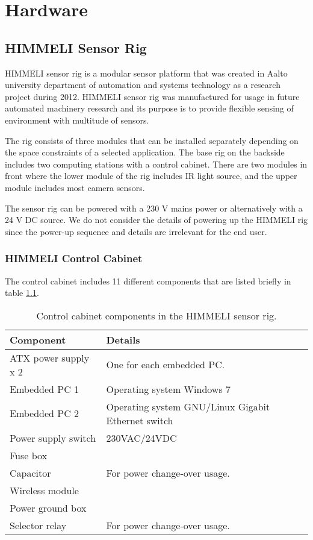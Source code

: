 \documentclass[12pt,a4paper,oneside,pdftex]{report}
\begin{document}
\chapter{Hardware}

\section{HIMMELI Sensor Rig}

HIMMELI sensor rig is a modular sensor platform that was created in Aalto university department of automation and systems technology as a research project during 2012. HIMMELI sensor rig was manufactured for usage in future automated machinery research and its purpose is to provide flexible sensing of environment with multitude of sensors.

The rig consists of three modules that can be installed separately depending on the space constraints of a selected application. The base rig on the backside includes two computing stations with a control cabinet. There are two modules in front where the lower module of the rig includes IR light source, and the upper module includes most camera sensors.

The sensor rig can be powered with a 230 V mains power or alternatively with a 24 V DC source. We do not consider the details of powering up the HIMMELI rig since the power-up sequence and details are irrelevant for the end user.

\subsection{HIMMELI Control Cabinet}

The control cabinet includes 11 different components that are listed briefly in table \ref{table:controlcabinet}.

\begin{table}
\caption{Control cabinet components in the HIMMELI sensor rig.}
\label{table:controlcabinet}
\begin{tabular}{|p{6cm}|p{5cm}|}
\hline
\textbf{Component} & \textbf{Details} \\
\hline
ATX power supply x 2 & One for each embedded PC. \\
\hline
Embedded PC 1 & Operating system Windows 7 \\
\hline
Embedded PC 2 & Operating system GNU/Linux
\hline
Gigabit Ethernet switch & \\
\hline
Power supply switch & 230VAC/24VDC \\
\hline
Fuse box & \\
\hline
Capacitor & For power change-over usage. \\
\hline
Wireless module & \\
\hline
Power ground box & \\
\hline
Selector relay & For power change-over usage. \\ \hline
\end{tabular}
\end{table}
\end{document}
